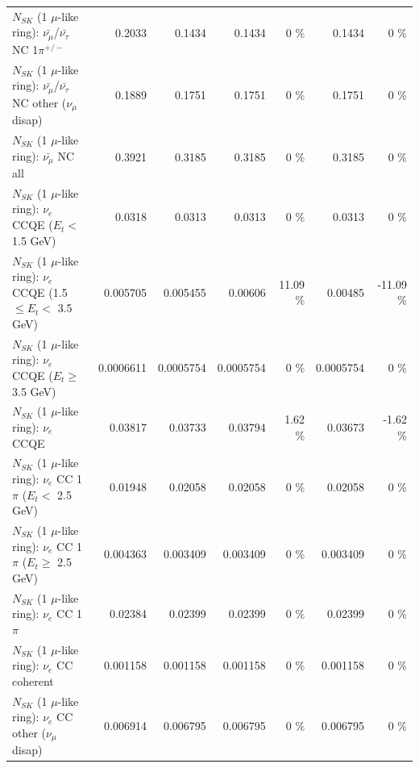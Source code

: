 \begin{table}
\begin{tabular}{| l | r | r | r  r | r  r |}
\hline
  $N_{SK}$ (1 $\mu$-like ring): $\bar{\nu_\mu}$/$\bar{\nu_\tau}$ NC 1$\pi^{+/-}$ &          0.2033 &          0.1434 &          0.1434 &        0 \%  &          0.1434 &        0 \%  \\ 
$N_{SK}$ (1 $\mu$-like ring): $\bar{\nu_\mu}$/$\bar{\nu_\tau}$ NC other ($\nu_\mu$ disap) &          0.1889 &          0.1751 &          0.1751 &        0 \%  &          0.1751 &        0 \%  \\ 
                          $N_{SK}$ (1 $\mu$-like ring): $\bar{\nu_{\mu}}$ NC all &          0.3921 &          0.3185 &          0.3185 &        0 \%  &          0.3185 &        0 \%  \\ 
\hline
\hline
\hline
                  $N_{SK}$ (1 $\mu$-like ring): $\nu_e$ CCQE ($E_{t} <$ 1.5 GeV) &          0.0318 &          0.0313 &          0.0313 &        0 \%  &          0.0313 &        0 \%  \\ 
         $N_{SK}$ (1 $\mu$-like ring): $\nu_e$ CCQE (1.5 $\leq E_{t} <$ 3.5 GeV) &        0.005705 &        0.005455 &         0.00606 &    11.09 \%  &         0.00485 &   -11.09 \%  \\ 
               $N_{SK}$ (1 $\mu$-like ring): $\nu_e$ CCQE ($E_{t} \geq$ 3.5 GeV) &       0.0006611 &       0.0005754 &       0.0005754 &        0 \%  &       0.0005754 &        0 \%  \\ 
\hline
                                      $N_{SK}$ (1 $\mu$-like ring): $\nu_e$ CCQE &         0.03817 &         0.03733 &         0.03794 &     1.62 \%  &         0.03673 &    -1.62 \%  \\ 
\hline
             $N_{SK}$ (1 $\mu$-like ring): $\nu_e$ CC 1$\pi$ ($E_{t} <$ 2.5 GeV) &         0.01948 &         0.02058 &         0.02058 &        0 \%  &         0.02058 &        0 \%  \\ 
          $N_{SK}$ (1 $\mu$-like ring): $\nu_e$ CC 1$\pi$ ($E_{t} \geq$ 2.5 GeV) &        0.004363 &        0.003409 &        0.003409 &        0 \%  &        0.003409 &        0 \%  \\ 
\hline
                                 $N_{SK}$ (1 $\mu$-like ring): $\nu_e$ CC 1$\pi$ &         0.02384 &         0.02399 &         0.02399 &        0 \%  &         0.02399 &        0 \%  \\ 
                               $N_{SK}$ (1 $\mu$-like ring): $\nu_e$ CC coherent &        0.001158 &        0.001158 &        0.001158 &        0 \%  &        0.001158 &        0 \%  \\ 
                $N_{SK}$ (1 $\mu$-like ring): $\nu_e$ CC other ($\nu_\mu$ disap) &        0.006914 &        0.006795 &        0.006795 &        0 \%  &        0.006795 &        0 \%  \\ 

\end{tabular}
\end{table}
